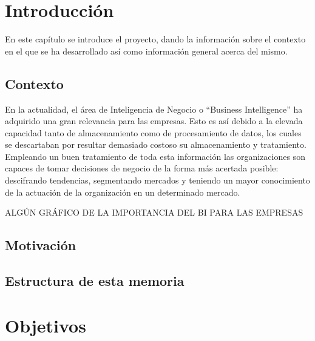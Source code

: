 \documentclass[a4paper, 12pt]{book}
\begin{document}
\cleardoublepage
\chapter{Introducción}
\label{sec:intro} %

En este capítulo se introduce el proyecto, dando la información sobre el contexto en el que se ha desarrollado así como información general acerca del mismo.

\section{Contexto}
\label{sec:Contexto}

En la actualidad, el área de Inteligencia de Negocio o ``Business Intelligence'' ha adquirido una gran relevancia para las empresas. Esto es así debido a la elevada capacidad tanto de almacenamiento como de procesamiento de datos, los cuales se descartaban por resultar demasiado costoso su almacenamiento y tratamiento. Empleando un buen tratamiento de toda esta información las organizaciones son capaces de tomar decisiones de negocio de la forma más acertada posible: descifrando tendencias, segmentando mercados y teniendo un mayor conocimiento de la actuación de la organización en un determinado mercado.

ALGÚN GRÁFICO DE LA IMPORTANCIA DEL BI PARA LAS EMPRESAS


\section{Motivación}
\label{sec:motivacion}


\section{Estructura de esta memoria}
\label{sec:estructura}




\cleardoublepage
\chapter{Objetivos}
\label{chap:objetivos}
\end{document}
